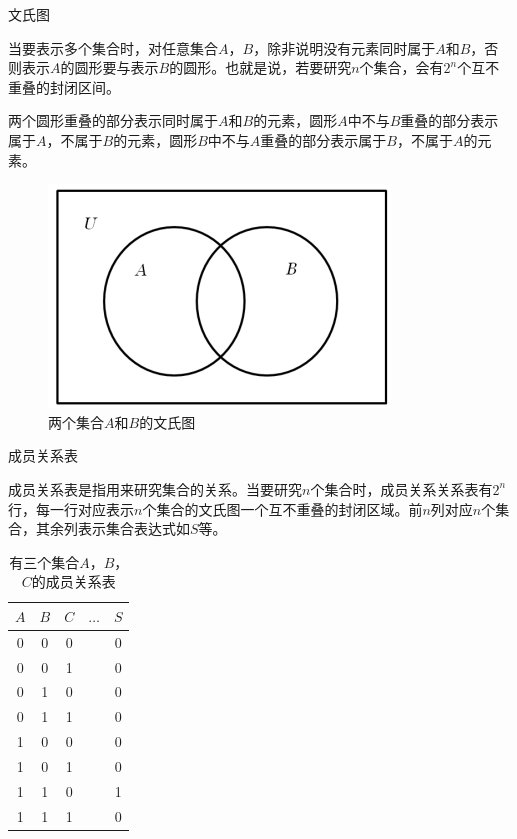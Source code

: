 \documentclass[xetex,10pt,aspectratio=43]{beamer}
\begin{document}
	\begin{frame}{文氏图}
		
		当要表示多个集合时，对任意集合$A$，$B$，除非说明没有元素同时属于$A$和$B$，否则表示$A$的圆形要与表示$B$的圆形\textcolor{red}{}。也就是说，若要研究$n$个集合，会有$2^n$个互不重叠的封闭区间。
		
		两个圆形重叠的部分表示同时属于$A$和$B$的元素，圆形$A$中不与$B$重叠的部分表示属于$A$，不属于$B$的元素，圆形$B$中不与$A$重叠的部分表示属于$B$，不属于$A$的元素。
		
		\begin{figure}
			
			\centering
			
			\includegraphics[scale=0.5]{0.png}
			
			\caption{两个集合$A$和$B$的文氏图}
			
		\end{figure}
		
	\end{frame}

	\begin{frame}{成员关系表}
		
		成员关系表是指用\textcolor{red}{}来研究集合的关系。当要研究$n$个集合时，成员关系关系表有$2^n$行，每一行对应表示$n$个集合的文氏图一个互不重叠的封闭区域。前$n$列对应$n$个集合，其余列表示集合表达式如$S$等。
		
		\begin{table}
			
			\centering
			
			\caption{有三个集合$A$，$B$，$C$的成员关系表}
			
			\begin{tabular}{|c|c|c|c|c|}
				\hline
				$A$ & $B$ & $C$ & $\dots$ & $S$\\
				\hline
				0 & 0 & 0 &  & 0\\
				\hline
				0 & 0 & 1 &  & 0\\
				\hline
				0 & 1 & 0 &  & 0\\
				\hline
				0 & 1 & 1 &  & 0\\
				\hline
				1 & 0 & 0 &  & 0\\
				\hline
				1 & 0 & 1 &  & 0\\
				\hline
				1 & 1 & 0 &  & 1\\
				\hline
				1 & 1 & 1 &  & 0\\
				\hline
			\end{tabular}
		
		\end{table}
		
	\end{frame}
\end{document}
